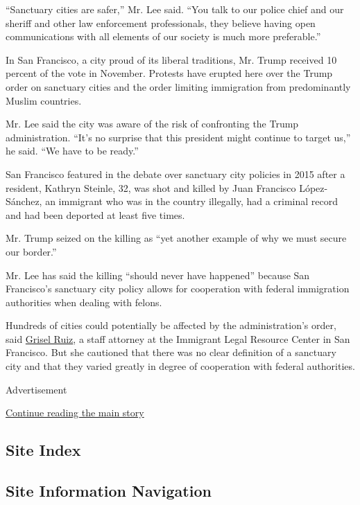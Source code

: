 ``Sanctuary cities are safer,'' Mr. Lee said. ``You talk to our police
chief and our sheriff and other law enforcement professionals, they
believe having open communications with all elements of our society is
much more preferable.''

In San Francisco, a city proud of its liberal traditions, Mr. Trump
received 10 percent of the vote in November. Protests have erupted here
over the Trump order on sanctuary cities and the order limiting
immigration from predominantly Muslim countries.

Mr. Lee said the city was aware of the risk of confronting the Trump
administration. ``It's no surprise that this president might continue to
target us,'' he said. ``We have to be ready.''

San Francisco featured in the debate over sanctuary city policies in
2015 after a resident, Kathryn Steinle, 32, was shot and killed by Juan
Francisco López-Sánchez, an immigrant who was in the country illegally,
had a criminal record and had been deported at least five times.

Mr. Trump seized on the killing as ``yet another example of why we must
secure our border.''

Mr. Lee has said the killing ``should never have happened'' because San
Francisco's sanctuary city policy allows for cooperation with federal
immigration authorities when dealing with felons.

Hundreds of cities could potentially be affected by the administration's
order, said \href{https://www.ilrc.org/grisel-ruiz}{Grisel Ruiz}, a
staff attorney at the Immigrant Legal Resource Center in San Francisco.
But she cautioned that there was no clear definition of a sanctuary city
and that they varied greatly in degree of cooperation with federal
authorities.

Advertisement

\protect\hyperlink{after-bottom}{Continue reading the main story}

\hypertarget{site-index}{%
\subsection{Site Index}\label{site-index}}

\hypertarget{site-information-navigation}{%
\subsection{Site Information
Navigation}\label{site-information-navigation}}

